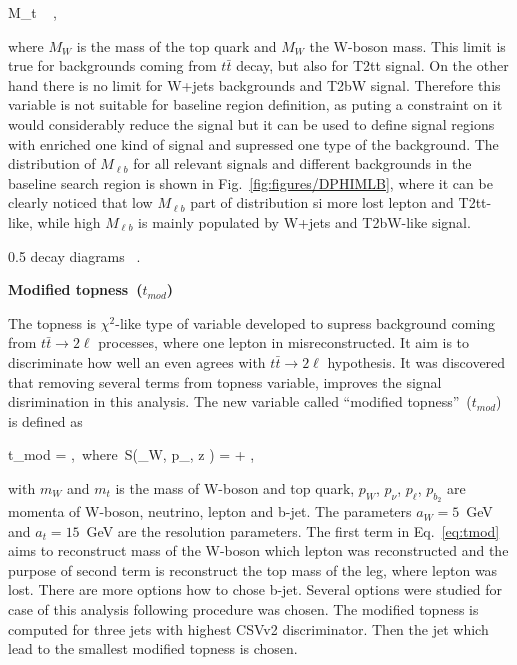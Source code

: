 {
 M_{t}  ~ ,
}

where $M_{W}$ is the mass of the top quark and $M_{W}$ the W-boson mass. This limit is true for backgrounds coming from $t\bar{t}$ decay, but also for T2tt signal. On the other hand there is no limit for W+jets backgrounds and T2bW signal. Therefore this variable is not suitable for baseline region definition, as puting a constraint on it would considerably reduce the signal but it can be used to define signal regions with enriched one kind of signal and supressed one type of the background. The distribution of  $M_{\ell b}$ for all relevant signals and different backgrounds in the baseline search region is shown in Fig.~\ref{fig:figures/DPHIMLB}, where it can be clearly noticed that low $M_{\ell b}$ part of distribution si more lost lepton and T2tt-like, while high $M_{\ell b}$ is mainly populated by W+jets and T2bW-like signal.

                 {0.5}       %
                 { decay diagrams ~\cite{CMS:2016vew}. }

\textbf{Modified topness~($t_{mod}$)}

The topness is $\chi^{2}$-like type of variable developed to supress background coming from $t \bar{t} \to 2\ell$ processes, where one lepton in misreconstructed. It aim is to discriminate how well an even agrees with $t \bar{t} \to 2\ell$ hypothesis. It was discovered that removing several terms from topness variable, improves the signal disrimination in this analysis. The new variable called ``modified topness''~($t_{mod}$) is defined as


{
 t_{mod} = ,~where~S(_{W}, p_{\nu, z} ) =  + ,
}

with $m_{W}$ and  $m_{t}$ is the mass of W-boson and top quark, ${p}_{W}$, ${p}_{\nu}$, ${p}_{\ell}$, ${p}_{b_{2}}$ are momenta of W-boson, neutrino, lepton and b-jet. The parameters $a_{W} =5$~GeV and $a_{t}=15$~GeV are the resolution parameters. The first term in Eq.~\ref{eq:tmod} aims to reconstruct mass of the W-boson which lepton was reconstructed and the purpose of second term is reconstruct the top mass of the leg, where lepton was lost. There are more options how to chose  b-jet. Several options were studied for case of this analysis following procedure was chosen. The modified topness is computed for three jets with highest CSVv2 discriminator. Then the jet which lead to the smallest modified topness is chosen.

